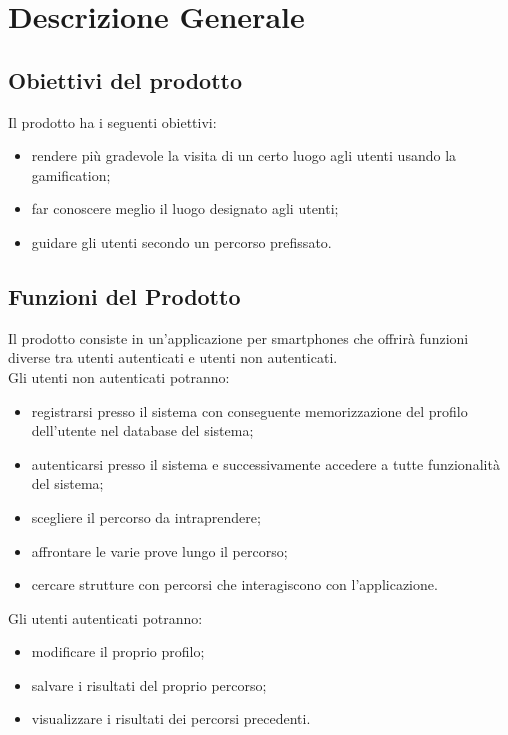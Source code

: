 \section{Descrizione Generale}
\label{sec:DescrizioneGenerale}

	\subsection{Obiettivi del prodotto}
	\label{sec:ObiettiviDelProdotto}
		Il prodotto ha i seguenti obiettivi:
		\begin{itemize}
			\item rendere più gradevole la visita di un certo luogo agli utenti usando la gamification;
			\item far conoscere meglio il luogo designato agli utenti;
			\item guidare gli utenti secondo un percorso prefissato.
		\end{itemize}
	
	\subsection{Funzioni del Prodotto}
	\label{sub:Funzioni del Prodotto}
		Il prodotto consiste in un'applicazione per smartphones che offrirà funzioni diverse tra utenti autenticati e utenti non autenticati. \\
		Gli utenti non autenticati potranno:
		\begin{itemize}
			\item registrarsi presso il sistema con conseguente memorizzazione del profilo dell'utente nel database del sistema;
			\item autenticarsi presso il sistema e successivamente accedere a tutte funzionalità del sistema;
			\item scegliere il percorso da intraprendere;
			\item affrontare le varie prove lungo il percorso;
			\item cercare strutture con percorsi che interagiscono con l'applicazione.
		\end{itemize}
		Gli utenti autenticati potranno:
		\begin{itemize}
			\item modificare il proprio profilo;
			\item salvare i risultati del proprio percorso;
			\item visualizzare i risultati dei percorsi precedenti.
		\end{itemize}
	
